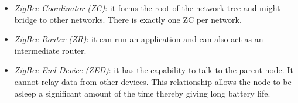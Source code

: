 \begin{itemize}
{\begin{itemize}
\item{\emph{ZigBee Coordinator (ZC)}: it forms the root of the network tree and might bridge to other networks. There is exactly one ZC per network. }
\item{\emph{ZigBee Router (ZR)}: it can run an application and can also act as an intermediate router. }
\item{\emph{ZigBee End Device (ZED)}: it has the capability to talk to the parent node. It cannot relay data from other devices. This relationship allows the node to be asleep a significant amount of the time thereby giving long battery life.}
\end{itemize}
}
\end{itemize}
